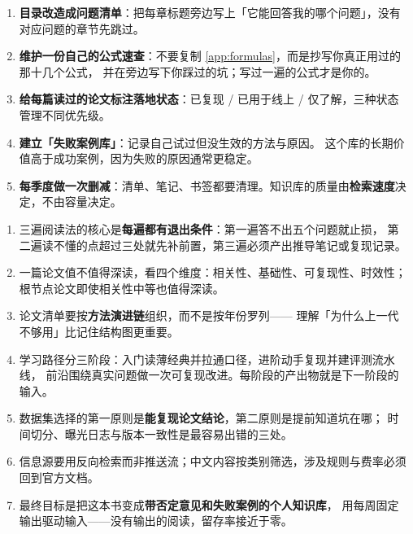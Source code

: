 \begin{toolbox}[让这本书变成知识库的五个动作]
\begin{enumerate}
  \item \textbf{目录改造成问题清单}：把每章标题旁边写上「它能回答我的哪个问题」，没有对应问题的章节先跳过。
  \item \textbf{维护一份自己的公式速查}：不要复制 \cref{app:formulas}，而是抄写你真正用过的那十几个公式，
        并在旁边写下你踩过的坑；写过一遍的公式才是你的。
  \item \textbf{给每篇读过的论文标注落地状态}：已复现 / 已用于线上 / 仅了解，三种状态管理不同优先级。
  \item \textbf{建立「失败案例库」}：记录自己试过但没生效的方法与原因。
        这个库的长期价值高于成功案例，因为失败的原因通常更稳定。
  \item \textbf{每季度做一次删减}：清单、笔记、书签都要清理。知识库的质量由\textbf{检索速度}决定，不由容量决定。
\end{enumerate}
\end{toolbox}

\begin{keypoint}[本附录要点回顾]
\begin{enumerate}
  \item 三遍阅读法的核心是\textbf{每遍都有退出条件}：第一遍答不出五个问题就止损，
        第二遍读不懂的点超过三处就先补前置，第三遍必须产出推导笔记或复现记录。
  \item 一篇论文值不值得深读，看四个维度：相关性、基础性、可复现性、时效性；
        根节点论文即使相关性中等也值得深读。
  \item 论文清单要按\textbf{方法演进链}组织，而不是按年份罗列——
        理解「为什么上一代不够用」比记住结构图更重要。
  \item 学习路径分三阶段：入门读薄经典并拉通口径，进阶动手复现并建评测流水线，
        前沿围绕真实问题做一次可复现改进。每阶段的产出物就是下一阶段的输入。
  \item 数据集选择的第一原则是\textbf{能复现论文结论}，第二原则是提前知道坑在哪；
        时间切分、曝光日志与版本一致性是最容易出错的三处。
  \item 信息源要用反向检索而非推送流；中文内容按类别筛选，涉及规则与费率必须回到官方文档。
  \item 最终目标是把这本书变成\textbf{带否定意见和失败案例的个人知识库}，
        用每周固定输出驱动输入——没有输出的阅读，留存率接近于零。
\end{enumerate}
\end{keypoint}

